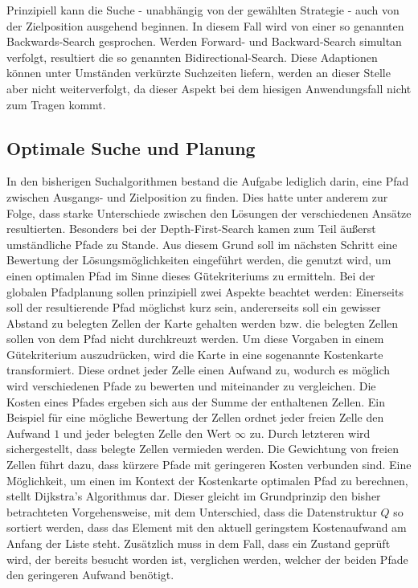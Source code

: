 Prinzipiell kann die Suche - unabhängig von der gewählten Strategie - auch von der Zielposition ausgehend beginnen. In diesem Fall wird von einer so genannten Backwards-Search gesprochen. Werden Forward- und Backward-Search simultan verfolgt, resultiert die so genannten Bidirectional-Search. Diese Adaptionen können unter Umständen verkürzte Suchzeiten liefern, werden an dieser Stelle aber nicht weiterverfolgt, da dieser Aspekt bei dem hiesigen Anwendungsfall nicht zum Tragen kommt.

\subsection{Optimale Suche und Planung}
In den bisherigen Suchalgorithmen bestand die Aufgabe lediglich darin, eine Pfad zwischen Ausgangs- und Zielposition zu finden. Dies hatte unter anderem zur Folge, dass starke Unterschiede zwischen den Lösungen der verschiedenen Ansätze resultierten. Besonders bei der Depth-First-Search kamen zum Teil äußerst umständliche Pfade zu Stande. Aus diesem Grund soll im nächsten Schritt eine Bewertung der Lösungsmöglichkeiten eingeführt werden, die genutzt wird, um einen optimalen Pfad im Sinne dieses Gütekriteriums zu ermitteln. Bei der globalen Pfadplanung sollen prinzipiell zwei Aspekte beachtet werden: Einerseits soll der resultierende Pfad möglichst kurz sein, andererseits soll ein gewisser Abstand zu belegten Zellen der Karte gehalten werden bzw. die belegten Zellen sollen von dem Pfad nicht durchkreuzt werden. Um diese Vorgaben in einem Gütekriterium auszudrücken, wird die Karte in eine sogenannte Kostenkarte transformiert. Diese ordnet jeder Zelle einen Aufwand zu, wodurch es möglich wird verschiedenen Pfade zu bewerten und miteinander zu vergleichen. Die Kosten eines Pfades ergeben sich aus der Summe der enthaltenen Zellen. Ein Beispiel für eine mögliche Bewertung der Zellen ordnet jeder freien Zelle den Aufwand $1$ und jeder belegten Zelle den Wert $\infty$ zu. Durch letzteren wird sichergestellt, dass belegte Zellen vermieden werden. Die Gewichtung von freien Zellen führt dazu, dass kürzere Pfade mit geringeren Kosten verbunden sind. Eine Möglichkeit, um einen im Kontext der Kostenkarte optimalen Pfad zu berechnen, stellt Dijkstra's Algorithmus dar. Dieser gleicht im Grundprinzip den bisher betrachteten Vorgehensweise, mit dem Unterschied, dass die Datenstruktur $Q$ so sortiert werden, dass das Element mit den aktuell geringstem Kostenaufwand am Anfang der Liste steht. Zusätzlich muss in dem Fall, dass ein Zustand geprüft wird, der bereits besucht worden ist, verglichen werden, welcher der beiden Pfade den geringeren Aufwand benötigt.

